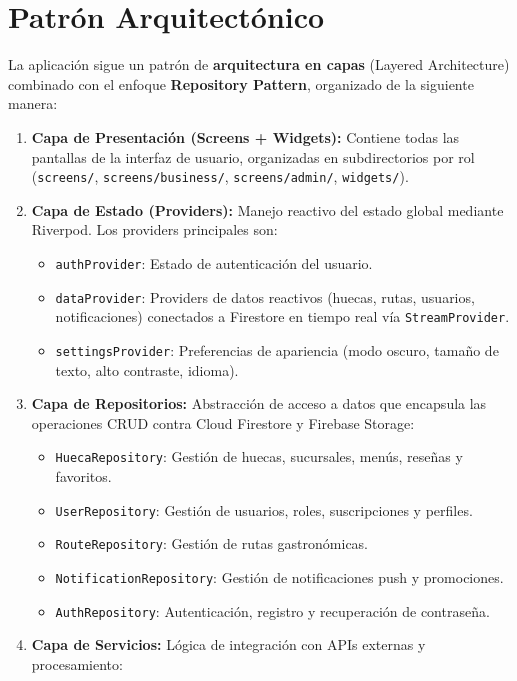 \documentclass[11pt, a4paper, oneside]{report}
\begin{document}
\section{Patrón Arquitectónico}

La aplicación sigue un patrón de \textbf{arquitectura en capas} (Layered Architecture) combinado con el enfoque \textbf{Repository Pattern}, organizado de la siguiente manera:

\begin{enumerate}
  \item \textbf{Capa de Presentación (Screens + Widgets):} Contiene todas las pantallas de la interfaz de usuario, organizadas en subdirectorios por rol (\texttt{screens/}, \texttt{screens/business/}, \texttt{screens/admin/}, \texttt{widgets/}).
  \item \textbf{Capa de Estado (Providers):} Manejo reactivo del estado global mediante Riverpod. Los providers principales son:
  \begin{itemize}
    \item \texttt{authProvider}: Estado de autenticación del usuario.
    \item \texttt{dataProvider}: Providers de datos reactivos (huecas, rutas, usuarios, notificaciones) conectados a Firestore en tiempo real vía \texttt{StreamProvider}.
    \item \texttt{settingsProvider}: Preferencias de apariencia (modo oscuro, tamaño de texto, alto contraste, idioma).
  \end{itemize}
  \item \textbf{Capa de Repositorios:} Abstracción de acceso a datos que encapsula las operaciones CRUD contra Cloud Firestore y Firebase Storage:
  \begin{itemize}
    \item \texttt{HuecaRepository}: Gestión de huecas, sucursales, menús, reseñas y favoritos.
    \item \texttt{UserRepository}: Gestión de usuarios, roles, suscripciones y perfiles.
    \item \texttt{RouteRepository}: Gestión de rutas gastronómicas.
    \item \texttt{NotificationRepository}: Gestión de notificaciones push y promociones.
    \item \texttt{AuthRepository}: Autenticación, registro y recuperación de contraseña.
  \end{itemize}
  \item \textbf{Capa de Servicios:} Lógica de integración con APIs externas y procesamiento:

\end{enumerate}
\end{document}
